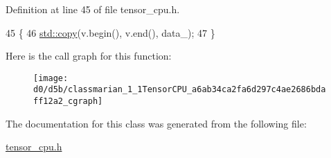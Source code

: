 Definition at line 45 of file tensor\+\_\+cpu.\+h.


\begin{DoxyCode}
45                                       \{
46     \hyperlink{namespaceamunmt_1_1GPU_1_1mblas_a6531a040aa422fcd149f89b92f6d2585}{std::copy}(v.begin(), v.end(), data\_);
47   \}
\end{DoxyCode}


Here is the call graph for this function\+:
\nopagebreak
\begin{figure}[H]
\begin{center}
\leavevmode
\texttt{[image: d0/d5b/classmarian\_1\_1TensorCPU\_a6ab34ca2fa6d297c4ae2686bdaff12a2\_cgraph]}
\end{center}
\end{figure}




The documentation for this class was generated from the following file\+:\begin{DoxyCompactItemize}
\item 
\hyperlink{tensor__cpu_8h}{tensor\+\_\+cpu.\+h}\end{DoxyCompactItemize}
